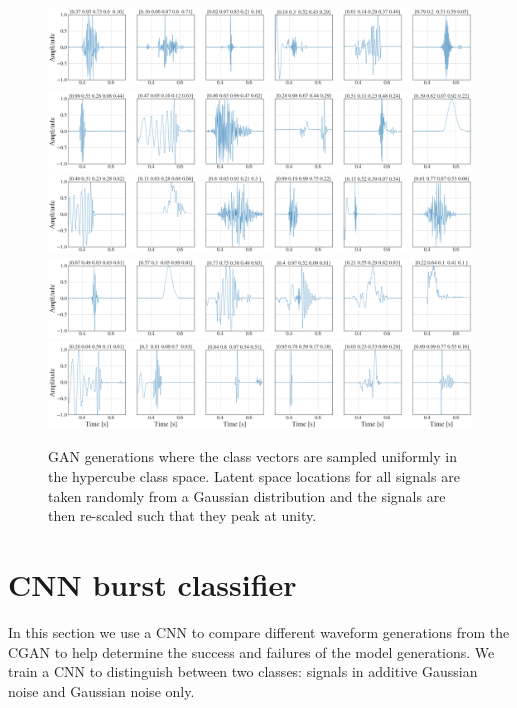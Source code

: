 \documentclass[12pt]{iopart}
\begin{document}
\begin{figure}
    \centering
    \includegraphics[width=\textwidth]{figures/generations/uniform_sample1.png}
    \includegraphics[width=\textwidth]{figures/generations/uniform_sample2.png}
    \includegraphics[width=\textwidth]{figures/generations/uniform_sample3.png}
    \includegraphics[width=\textwidth]{figures/generations/uniform_sample4.png}
    \includegraphics[width=\textwidth]{figures/generations/uniform_sample5.png}
    \caption{GAN generations where the class vectors are sampled uniformly in the hypercube class space. Latent space locations for all signals are taken randomly from a Gaussian distribution and the signals are then re-scaled such that they peak at unity.}
    \label{fig:uniform_samples}
\end{figure}

\section{CNN burst classifier} \label{cnn classifier}
In this section  we use a \ac{CNN}
to compare different waveform generations from the \ac{CGAN} to help determine the
success and failures of the model generations. We train a \ac{CNN} to distinguish between two classes: signals in additive Gaussian
noise and Gaussian noise only. 
\end{document}
